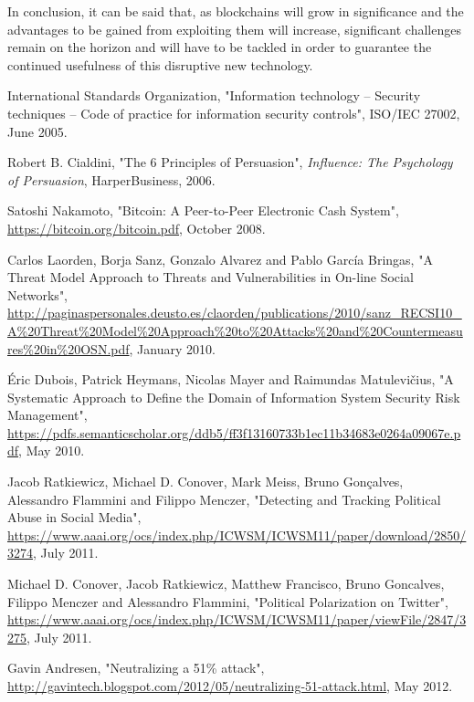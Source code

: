 \documentclass[12pt,a4paper]{article}
\begin{document}
In conclusion, it can be said that, as \glspl{blockchain} will grow in significance and the advantages to be gained from exploiting them will increase, significant challenges remain on the horizon and will have to be tackled in order to guarantee the continued usefulness of this disruptive new technology.\\

\newpage
\begin{thebibliography}{9}

International Standards Organization,
"Information technology -- Security techniques -- Code of practice for information security controls",
ISO/IEC 27002,
June 2005.

Robert B. Cialdini,
"The 6 Principles of Persuasion",
\textit{Influence: The Psychology of Persuasion},
HarperBusiness, 2006.

Satoshi Nakamoto,
"Bitcoin: A Peer-to-Peer Electronic Cash System",
\url{https://bitcoin.org/bitcoin.pdf},
October 2008.

Carlos Laorden, Borja Sanz, Gonzalo Alvarez and Pablo García Bringas,
"A Threat Model Approach to Threats and Vulnerabilities in On-line Social Networks",
\url{http://paginaspersonales.deusto.es/claorden/publications/2010/sanz_RECSI10_A%20Threat%20Model%20Approach%20to%20Attacks%20and%20Countermeasures%20in%20OSN.pdf},
January 2010.

Éric Dubois, Patrick Heymans, Nicolas Mayer and Raimundas Matulevičius,
"A Systematic Approach to Define the Domain of Information System Security Risk Management",
\url{https://pdfs.semanticscholar.org/ddb5/ff3f13160733b1ec11b34683e0264a09067e.pdf},
May 2010.

Jacob Ratkiewicz, Michael D. Conover, Mark Meiss, Bruno Gonçalves, Alessandro Flammini and Filippo Menczer,
"Detecting and Tracking Political Abuse in Social Media",
\url{https://www.aaai.org/ocs/index.php/ICWSM/ICWSM11/paper/download/2850/3274},
July 2011.

Michael D. Conover, Jacob Ratkiewicz, Matthew Francisco, Bruno Goncalves, Filippo Menczer and Alessandro Flammini,
"Political Polarization on Twitter",
\url{https://www.aaai.org/ocs/index.php/ICWSM/ICWSM11/paper/viewFile/2847/3275},
July 2011.

Gavin Andresen,
"Neutralizing a 51\% attack",
\url{http://gavintech.blogspot.com/2012/05/neutralizing-51-attack.html},
May 2012.


\end{thebibliography}
\end{document}
